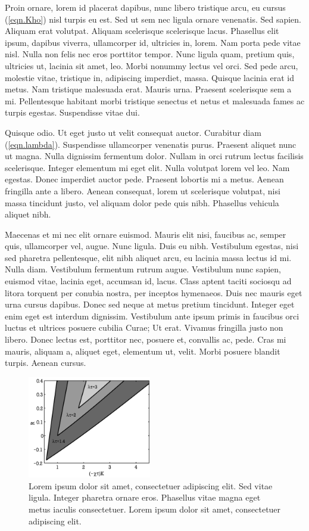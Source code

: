 \documentclass[article,colorback,accentcolor=tud4c]{tudreport}
\begin{document}
    Proin ornare, lorem id placerat dapibus, nunc libero tristique arcu, eu cursus (\ref{eqn.Kho}) nisl turpis eu est. Sed ut sem nec ligula ornare venenatis. Sed sapien. Aliquam erat volutpat. Aliquam scelerisque scelerisque lacus. Phasellus elit ipsum, dapibus viverra, ullamcorper id, ultricies in, lorem. Nam porta pede vitae nisl. Nulla non felis nec eros porttitor tempor. Nunc ligula quam, pretium quis, ultricies ut, lacinia sit amet, leo. Morbi nonummy lectus vel orci. Sed pede arcu, molestie vitae, tristique in, adipiscing imperdiet, massa. Quisque lacinia erat id metus. Nam tristique malesuada erat. Mauris urna. Praesent scelerisque sem a mi. Pellentesque habitant morbi tristique senectus et netus et malesuada fames ac turpis egestas. Suspendisse vitae dui.

    Quisque odio. Ut eget justo ut velit consequat auctor. Curabitur diam (\ref{eqn.lambda}). Suspendisse ullamcorper venenatis purus. Praesent aliquet nunc ut magna. Nulla dignissim fermentum dolor. Nullam in orci rutrum lectus facilisis scelerisque. Integer elementum mi eget elit. Nulla volutpat lorem vel leo. Nam egestas. Donec imperdiet auctor pede. Praesent lobortis mi a metus. Aenean fringilla ante a libero. Aenean consequat, lorem ut scelerisque volutpat, nisi massa tincidunt justo, vel aliquam dolor pede quis nibh. Phasellus vehicula aliquet nibh.

    Maecenas et mi nec elit ornare euismod. Mauris elit nisi, faucibus ac, semper quis, ullamcorper vel, augue. Nunc ligula. Duis eu nibh. Vestibulum egestas, nisi sed pharetra pellentesque, elit nibh aliquet arcu, eu lacinia massa lectus id mi. Nulla diam. Vestibulum fermentum rutrum augue. Vestibulum nunc sapien, euismod vitae, lacinia eget, accumsan id, lacus. Class aptent taciti sociosqu ad litora torquent per conubia nostra, per inceptos hymenaeos. Duis nec mauris eget urna cursus dapibus. Donec sed neque at metus pretium tincidunt. Integer eget enim eget est interdum dignissim. Vestibulum ante ipsum primis in faucibus orci luctus et ultrices posuere cubilia Curae; Ut erat. Vivamus fringilla justo non libero. Donec lectus est, porttitor nec, posuere et, convallis ac, pede. Cras mi mauris, aliquam a, aliquet eget, elementum ut, velit. Morbi posuere blandit turpis. Aenean cursus.
             \begin{figure}
                 \centering
                 \includegraphics[clip,width=0.48\textwidth]{TUDreport-fig}
                 \caption[Lorem ipsum dolor sit amet]{Lorem ipsum dolor sit amet, consectetuer adipiscing elit. Sed vitae ligula. Integer pharetra ornare eros. Phasellus vitae magna eget metus iaculis consectetuer. Lorem ipsum dolor sit amet, consectetuer adipiscing elit.}
             \end{figure}
\end{document}
